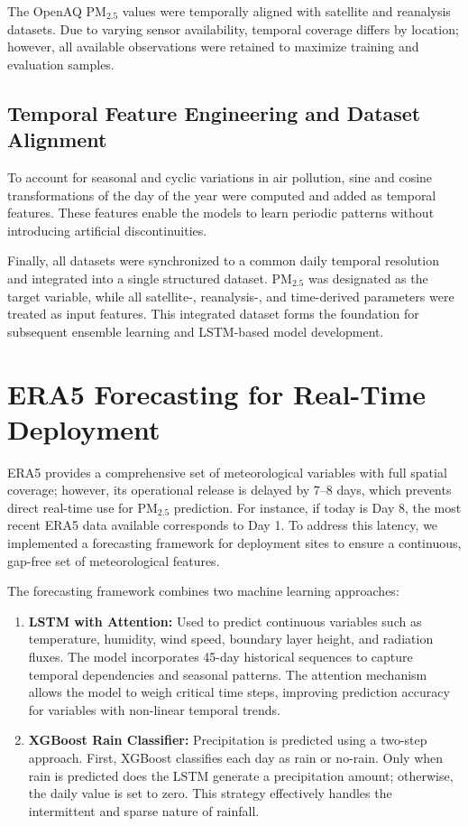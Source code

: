 \documentclass[12pt]{report}
\begin{document}
The OpenAQ PM$_{2.5}$ values were temporally aligned with satellite and reanalysis datasets. Due to varying sensor availability, temporal coverage differs by location; however, all available observations were retained to maximize training and evaluation samples.

\subsection{Temporal Feature Engineering and Dataset Alignment}

To account for seasonal and cyclic variations in air pollution, sine and cosine transformations of the day of the year were computed and added as temporal features. These features enable the models to learn periodic patterns without introducing artificial discontinuities.

Finally, all datasets were synchronized to a common daily temporal resolution and integrated into a single structured dataset. PM$_{2.5}$ was designated as the target variable, while all satellite-, reanalysis-, and time-derived parameters were treated as input features. This integrated dataset forms the foundation for subsequent ensemble learning and LSTM-based model development.

\section{ERA5 Forecasting for Real-Time Deployment}

ERA5 provides a comprehensive set of meteorological variables with full spatial coverage; however, its operational release is delayed by 7--8 days, which prevents direct real-time use for PM$_{2.5}$ prediction. For instance, if today is Day 8, the most recent ERA5 data available corresponds to Day 1. To address this latency, we implemented a forecasting framework for deployment sites to ensure a continuous, gap-free set of meteorological features.

The forecasting framework combines two machine learning approaches:

\begin{enumerate}
    \item \textbf{LSTM with Attention:} Used to predict continuous variables such as temperature, humidity, wind speed, boundary layer height, and radiation fluxes. The model incorporates 45-day historical sequences to capture temporal dependencies and seasonal patterns. The attention mechanism allows the model to weigh critical time steps, improving prediction accuracy for variables with non-linear temporal trends.
    
    \item \textbf{XGBoost Rain Classifier:} Precipitation is predicted using a two-step approach. First, XGBoost classifies each day as rain or no-rain. Only when rain is predicted does the LSTM generate a precipitation amount; otherwise, the daily value is set to zero. This strategy effectively handles the intermittent and sparse nature of rainfall.
\end{enumerate}
\end{document}
